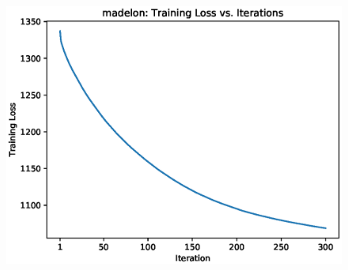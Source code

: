 \documentclass[UTF8]{article}
\begin{document}
\begin{figure}[H]
    \centering
    \includegraphics[scale=0.9]{./figures/madelon-loss.eps}
\end{figure}

\newpage
\end{document}
